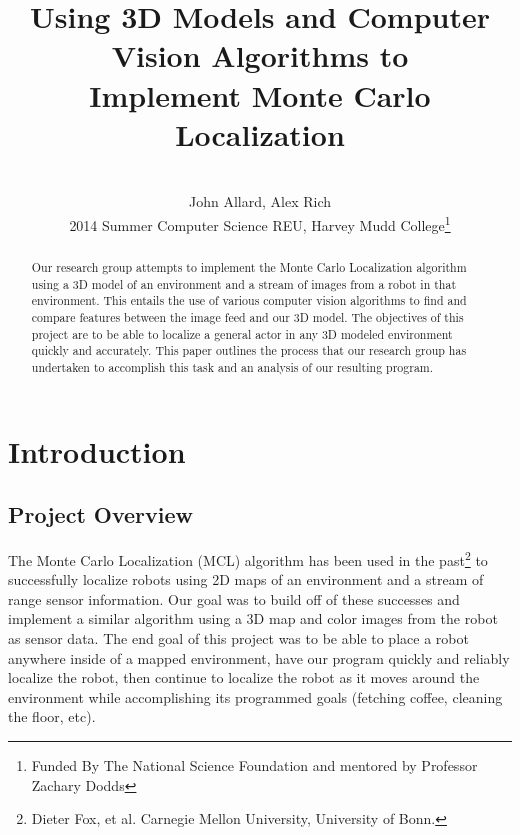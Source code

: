 \documentclass[a4paper,11pt]{article}
\title{Using 3D Models and Computer Vision Algorithms to \\ Implement Monte Carlo Localization}
\author{ \\[7in]  John Allard, Alex Rich \\ 2014 Summer Computer Science REU, Harvey Mudd College\thanks{Funded By The National Science Foundation and mentored by Professor Zachary Dodds}}
\begin{document}
  \maketitle   
  \newpage  
  
  \tableofcontents
  
  \newpage

  \begin{abstract}  
  Our research group attempts to implement the Monte Carlo Localization algorithm using a 3D model of an environment and a stream of images from a robot in that environment. This entails the use of various computer vision algorithms to find and compare features between the image feed and our 3D model. The objectives of this project are to be able to localize a general actor in any 3D modeled environment quickly and accurately. This paper outlines the process that our research group has undertaken to accomplish this task and an analysis of our resulting program. 
  \end{abstract}
  
















  \section{Introduction} 

  \subsection{Project Overview}
  The Monte Carlo Localization (MCL) algorithm has been used in the past\footnote{ Dieter Fox, et al. Carnegie Mellon University, University of Bonn.} to successfully localize robots using 2D maps of an environment and a stream of range sensor information. Our goal was to build off of these successes and implement a similar algorithm using a 3D map and color images from the robot as sensor data. The end goal of this project was to be able to place a robot anywhere inside of a mapped environment, have our program quickly and reliably localize the robot, then continue to localize the robot as it moves around the environment while accomplishing its programmed goals (fetching coffee, cleaning the floor, etc).
\end{document}
